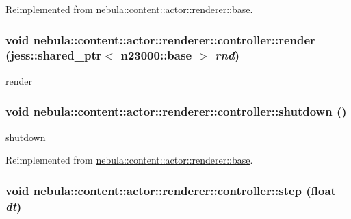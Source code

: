 Reimplemented from \hyperlink{classnebula_1_1content_1_1actor_1_1renderer_1_1base_a8cb55e87ac866ad14c7e1d03077681a9}{nebula::content::actor::renderer::base}.\hypertarget{classnebula_1_1content_1_1actor_1_1renderer_1_1controller_a921f5070e788bb83b089187a0c5040ff}{
\subsubsection[{render}]{\setlength{\rightskip}{0pt plus 5cm}void nebula::content::actor::renderer::controller::render (jess::shared\_\-ptr$<$ {\bf n23000::base} $>$ {\em rnd})}}
\label{classnebula_1_1content_1_1actor_1_1renderer_1_1controller_a921f5070e788bb83b089187a0c5040ff}


render \hypertarget{classnebula_1_1content_1_1actor_1_1renderer_1_1controller_aef42654ff81b3b0b39b532b3441cc518}{
\subsubsection[{shutdown}]{\setlength{\rightskip}{0pt plus 5cm}void nebula::content::actor::renderer::controller::shutdown ()}}
\label{classnebula_1_1content_1_1actor_1_1renderer_1_1controller_aef42654ff81b3b0b39b532b3441cc518}


shutdown 

Reimplemented from \hyperlink{classnebula_1_1content_1_1actor_1_1renderer_1_1base_abb61c46f573309a2f96a7fe6b95f5cd3}{nebula::content::actor::renderer::base}.\hypertarget{classnebula_1_1content_1_1actor_1_1renderer_1_1controller_adb754b3908d5188268d532022879c07f}{
\subsubsection[{step}]{\setlength{\rightskip}{0pt plus 5cm}void nebula::content::actor::renderer::controller::step (float {\em dt})}}
\label{classnebula_1_1content_1_1actor_1_1renderer_1_1controller_adb754b3908d5188268d532022879c07f}


